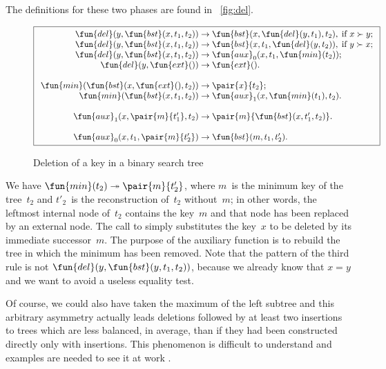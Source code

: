 The definitions for these two phases are found in \fig~\vref{fig:del}.
\begin{figure}[!b]
\begin{equation*}
\boxed{
\begin{array}{r@{\;}l@{\;}l}
  \fun{del}(y,\fun{bst}(x,t_1,t_2)) & \rightarrow &
  \fun{bst}(x,\fun{del}(y,t_1),t_2),\; \text{if \(x \succ y\)};\\
\fun{del}(y,\fun{bst}(x,t_1,t_2)) & \rightarrow &
  \fun{bst}(x,t_1,\fun{del}(y,t_2)),\; \text{if \(y \succ x\)};\\
\fun{del}(y,\fun{bst}(x,t_1,t_2)) & \rightarrow &
   \fun{aux}_0(x,t_1,\fun{min}(t_2));\\
\fun{del}(y,\fun{ext}()) & \rightarrow & \fun{ext}().\\
\\
\fun{min}(\fun{bst}(x,\fun{ext}(),t_2)) & \rightarrow & \pair{x}{t_2};\\
\fun{min}(\fun{bst}(x,t_1,t_2)) & \rightarrow &
  \fun{aux}_1(x,\fun{min}(t_1),t_2).\\
\\
\fun{aux}_1(x,\pair{m}{t'_1},t_2) & \rightarrow &
  \pair{m}{\fun{bst}(x,t'_1,t_2)}.\\
\\
\fun{aux}_0(x,t_1,\pair{m}{t'_2}) & \rightarrow & \fun{bst}(m,t_1,t'_2).
\end{array}}
\end{equation*}
\caption{Deletion of a key in a binary search tree}
\label{fig:del}
\end{figure}
We have \(\fun{min}(t_2) \twoheadrightarrow
\pair{m}{t'_2}\), where \(m\)~is the minimum
key of the tree~\(t_2\) and \(t'_2\)~is the reconstruction of~\(t_2\)
without~\(m\); in other words, the leftmost internal node of~\(t_2\)
contains the key~\(m\) and that node has been replaced by an external
node. The call to  simply substitutes the key~\(x\)
to be deleted by its immediate successor~\(m\). The purpose of the
auxiliary function  is to rebuild the tree in which
the minimum has been removed. Note that the pattern of the third rule
is not \(\fun{del}(y, \fun{bst}(y,t_1,t_2))\),
because we already know that \(x=y\) and we want to avoid a useless
equality test.

Of course, we could also have taken the maximum of the left subtree
and this arbitrary asymmetry actually leads deletions followed by at
least two insertions to trees which are less balanced, in average,
than if they had been constructed directly only with insertions. This
phenomenon is difficult to understand and examples are needed to see
it at work
\citep{Eppinger_1983,CulbersonMunro_1989,CulbersonEvans_1994,Knuth_1998a,Heyer_2009}.

